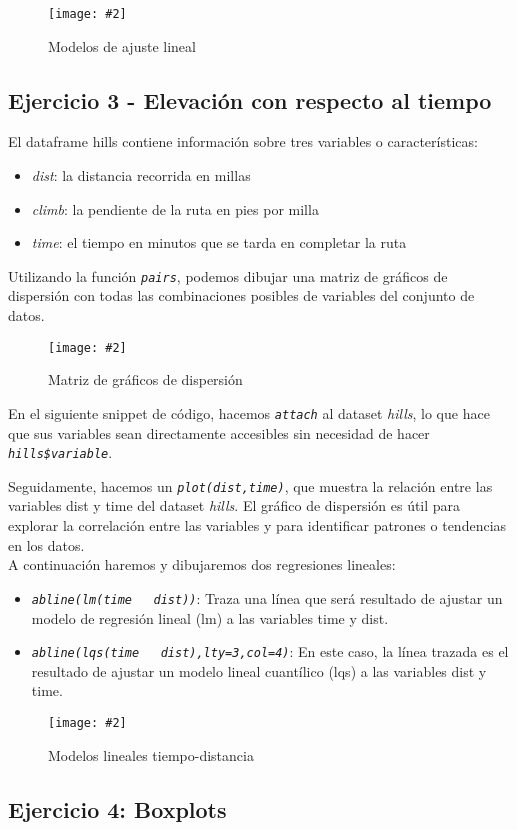 \documentclass[
12pt, 
spanish, 
singlespacing,
headsepline
]{article}
\newcommand{\image}[2]{
\begin{figure}[H]
	\caption{#1}
	\centering
	\texttt{[image: \#2]}
\end{figure}
}
\newcommand{\smallimage}[2]{
\begin{figure}[H]
	\caption{#1}
	\centering
	\texttt{[image: \#2]}
\end{figure}
}
\newcommand{\code}[1]{\textit{\texttt{#1}}}
\begin{document}
\image{Modelos de ajuste lineal}{R/ej2-linreg.png}

\subsection{Ejercicio 3 - Elevación con respecto al tiempo}
El dataframe hills contiene información sobre tres variables o características:
\begin{itemize}
\item \emph{dist}: la distancia recorrida en millas
\item \emph{climb}: la pendiente de la ruta en pies por milla
\item \emph{time}: el tiempo en minutos que se tarda en completar la ruta
\end{itemize}

Utilizando la función \code{pairs}, podemos dibujar una matriz de gráficos de dispersión con todas las combinaciones posibles de variables del conjunto de datos.

\image{Matriz de gráficos de dispersión}{R/multiplot.png}

En el siguiente snippet de código, hacemos \code{attach} al dataset \emph{hills}, lo que hace que sus variables sean directamente accesibles sin necesidad de hacer \code{hills\$variable}.

Seguidamente, hacemos un \code{plot(dist,time)}, que muestra la relación entre las variables dist y time del dataset \emph{hills}. El gráfico de dispersión es útil para explorar la correlación entre las variables y para identificar patrones o tendencias en los datos.
\\

A continuación haremos y dibujaremos dos regresiones lineales:
\begin{itemize}
\item \code{abline(lm(time ~ dist))}: Traza una línea que será resultado de ajustar un modelo de regresión lineal (lm) a las variables time y dist.
\item \code{abline(lqs(time ~ dist),lty=3,col=4)}: En este caso, la línea trazada es el resultado de ajustar un modelo lineal cuantílico (lqs) a las variables dist y time.
\end{itemize}

\smallimage{Modelos lineales tiempo-distancia}{R/hillslm.png}


\subsection{Ejercicio 4: Boxplots}
\end{document}
